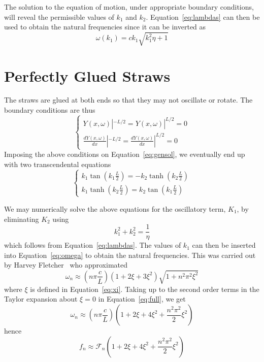 \documentclass[twoside]{article}
\begin{document}
\begin{multicols}{2}
The solution to the equation of motion, under appropriate boundary conditions, will reveal the permissible values of $k_1$ and $k_2$. Equation~\ref{eq:lambdas} can then be used to obtain the natural frequencies since it can be inverted as
\begin{equation}
\omega(k_1) =  c k_1 \sqrt{ k^2_1 \eta + 1}
\label{eq:omega}
\end{equation}







\section{Perfectly Glued Straws}
The straws are glued at both ends so that they may not oscillate or rotate.  The boundary conditions are thus
\begin{equation}
\label{eq:clamped}
\begin{cases}
Y(x,\omega)|^{-L/2} = Y(x,\omega)|^{L/2} = 0 \\
\frac{dY(x,\omega)}{dx}|^{-L/2} = \frac{dY(x,\omega)}{dx}|^{L/2} = 0 
\end{cases} 
\end{equation}
Imposing the above conditions on Equation~\ref{eq:gensol}, we eventually end up with two transcendental equations
\begin{equation}
\begin{cases}
k_1 \tan(k_1 \frac{L}{2}) = - k_2 \tanh(k_2 \frac{L}{2}) \\
k_1 \tanh(k_2 \frac{L}{2}) =  k_2 \tan(k_1 \frac{L}{2})  
\end{cases} 
\label{eq:trans}
\end{equation}

We may numerically solve the above equations for the oscillatory term, $K_1$, by eliminating $K_2$ using
\begin{equation}
k^2_1 + k^2_2 = \frac{1}{\eta}
\label{eq:rel}
\end{equation}
which follows from Equation~\ref{eq:lambdas}. The values of $k_1$ can then be inserted into Equation~\ref{eq:omega} to obtain the natural frequencies.  This was carried out by Harvey Fletcher~\cite{fletcher} who approximated 
 \begin{equation}
 	\omega_n \approx (n \pi \frac{c}{L})(1 + 2\xi + 3 \xi^2)\sqrt{1 + n^2\pi^2\xi^2}
 \label{eq:full}
 \end{equation}
 where $\xi$ is defined in Equation~\ref{eq:xi}.
 Taking up to the second order terms in the Taylor expansion about $\xi = 0$ in Equation~\ref{eq:full}, we get
  \begin{equation}
  \omega_n \approx (n \pi \frac{c}{L}) (1 + 2\xi + 4\xi^2 + \frac{n^2\pi^2}{2}\xi^2)
  \end{equation}
 hence
  \begin{equation}
  	f_n \approx \mathcal{F}_n (1 + 2\xi + 4\xi^2 + \frac{n^2\pi^2}{2}\xi^2)
 \label{eq:hence}
 \end{equation}
  

\end{multicols}
\end{document}
